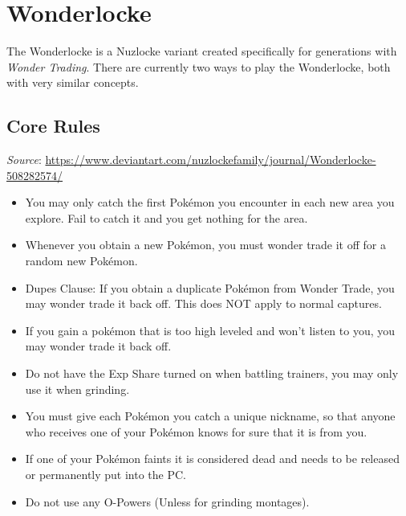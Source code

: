 \documentclass{article}
\begin{document}
\renewcommand{\labelitemi}{$\bullet$}

\section{Wonderlocke}
	The Wonderlocke is a Nuzlocke variant created specifically for generations with \textit{Wonder Trading}. There are currently two ways to play the Wonderlocke, both with very similar concepts.


	\subsection{Core Rules}
		\textit{Source}: \href{https://www.deviantart.com/nuzlockefamily/journal/Wonderlocke-508282574/}{https://www.deviantart.com/nuzlockefamily/journal/Wonderlocke-508282574/}
		\begin{itemize}
			\item 
				You may only catch the first Pokémon you encounter in each new area you explore. Fail to catch it and you get nothing for the area.
			\item 
				Whenever you obtain a new Pokémon, you must wonder trade it off for a random new Pokémon.
			\item 
				Dupes Clause: If you obtain a duplicate Pokémon from Wonder Trade, you may wonder trade it back off. This does NOT apply to normal captures.
			\item 
				If you gain a pokémon that is too high leveled and won't listen to you, you may wonder trade it back off.
			\item 
				Do not have the Exp Share turned on when battling trainers, you may only use it when grinding.
			\item 
				You must give each Pokémon you catch a unique nickname, so that anyone who receives one of your Pokémon knows for sure that it is from you.
			\item 
				If one of your Pokémon faints it is considered dead and needs to be released or permanently put into the PC.
			\item
				Do not use any O-Powers (Unless for grinding montages).
		\end{itemize}
\end{document}
